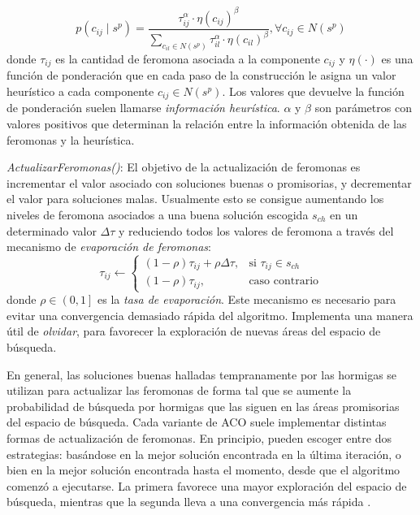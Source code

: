 \documentclass{llncs}
\begin{document}
	\begin{equation}
	\label{eq:chooseComponent}
	p(c_{ij} \mid s^p) = \frac{\tau_{ij}^\alpha \cdot \eta(c_{ij})^\beta}{\sum_{c_{il} \in N(s^p)} \tau_{il}^\alpha \cdot \eta(c_{il})^\beta}, \forall c_{ij} \in N(s^p)
	\end{equation}
	donde $\tau_{ij}$ es la cantidad de feromona asociada a la componente $c_{ij}$ y $\eta(\cdot)$
	es una función de ponderación que en cada paso de la construcción le asigna un valor heurístico a cada componente $c_{ij} \in N(s^p)$. Los valores que devuelve la función de ponderación suelen llamarse \textit{información heurística}. $\alpha$ y $\beta$ son parámetros con valores positivos que determinan la relación entre la información obtenida de las feromonas y la heurística.
	\bigbreak
	
	\textit{ActualizarFeromonas()}: El objetivo de la actualización de feromonas es incrementar el valor asociado con soluciones buenas o promisorias, y decrementar el valor para soluciones malas. Usualmente esto se consigue aumentando los niveles de feromona asociados a una buena solución escogida $s_{ch}$ en un determinado valor $\Delta\tau$ y reduciendo todos los valores de feromona a través del mecanismo de \textit{evaporación de feromonas}:
	\begin{equation*}
		\tau_{ij} \gets
		\begin{cases}
		(1 - \rho) \tau_{ij} + \rho\Delta\tau,& \text{si } \tau_{ij}\in s_{ch}\\
		(1 - \rho) \tau_{ij},              & \text{caso contrario}
		\end{cases}
	\end{equation*} 
	donde $\rho \in \left(0,1\right]$ es la \textit{tasa de evaporación}. Este mecanismo es necesario para evitar 
	una convergencia demasiado rápida del algoritmo. Implementa una manera útil de \textit{olvidar}, para 
	favorecer la exploración de nuevas áreas del espacio de búsqueda.
	
	En general, las soluciones buenas halladas tempranamente por las hormigas se utilizan para actualizar 
	las feromonas de forma tal que se aumente la probabilidad de búsqueda por hormigas que las siguen
	en las áreas promisorias del espacio de búsqueda. Cada variante de ACO suele implementar distintas formas de 
	actualización de feromonas. En principio, pueden escoger entre dos estrategias: basándose en la mejor solución 
	encontrada en la última iteración, o bien en la mejor solución encontrada hasta el momento, desde que el algoritmo 
	comenzó a ejecutarse. La primera favorece una mayor exploración del espacio de búsqueda, mientras que la segunda 
	lleva a una convergencia más rápida \cite{stu:dor}.
	\bigbreak
	
\end{document}
